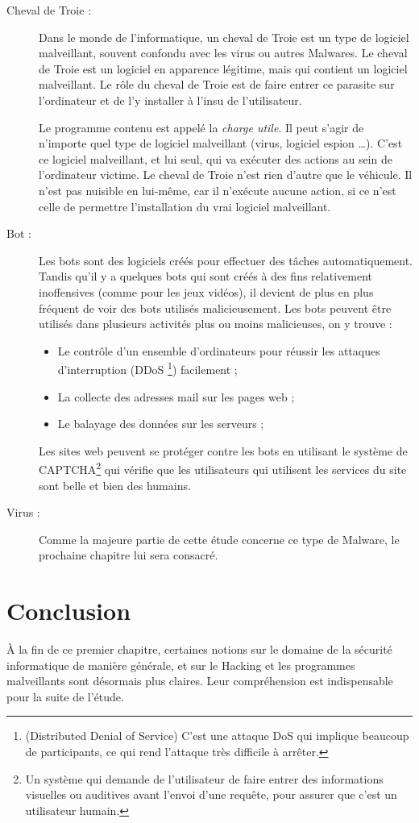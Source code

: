 \begin{description}
        \item[Cheval de Troie :] Dans le monde de l'informatique, un cheval de Troie est un type de logiciel
            malveillant, souvent confondu avec les virus ou autres Malwares. Le cheval de Troie est un logiciel
            en apparence légitime, mais qui contient un logiciel malveillant. Le rôle du cheval de Troie est de faire
            entrer ce parasite sur l'ordinateur et de l'y installer à l'insu de l'utilisateur.

            Le programme contenu est appelé la \emph{charge utile}. Il peut s'agir de n'importe quel type
            de logiciel malveillant (virus, logiciel espion \ldots). C'est ce logiciel malveillant, et lui
            seul, qui va exécuter des actions au sein de l'ordinateur victime. Le cheval de Troie n'est rien
            d'autre que le véhicule. Il n'est pas nuisible en lui-même, car il n'exécute aucune action,
            si ce n'est celle de permettre l'installation du vrai logiciel malveillant. 
            \cite{wikipedia_trojan} %

        \item[Bot :] Les bots sont des logiciels créés pour effectuer des tâches automatiquement. 
            Tandis qu’il y a quelques bots qui sont créés à des fins relativement inoffensives 
            (comme pour les jeux vidéos), il devient de plus en plus fréquent de voir des bots utilisés malicieusement. 
            Les bots peuvent être utilisés dans plusieurs activités plus ou moins malicieuses, on y trouve :
            \begin{itemize}
                \item Le contrôle d'un ensemble d’ordinateurs pour réussir les attaques d’interruption (DDoS
                    \footnote{(Distributed Denial of Service) C'est une attaque DoS qui implique beaucoup de
                    participants, ce qui rend l'attaque très difficile à arrêter.}) facilement ;
                \item La collecte des adresses mail sur les pages web ;
                \item Le balayage des données sur les serveurs ;
            \end{itemize}
            Les sites web peuvent se protéger contre les bots en utilisant le système de 
            CAPTCHA\footnote{Un système qui demande de l'utilisateur de faire entrer des informations visuelles ou
            auditives avant l'envoi d'une requête, pour assurer que c'est un utilisateur humain.} qui vérifie que 
            les utilisateurs qui utilisent les services du site sont belle et bien des humains. 
            \cite{malware_types} %

            \item[Virus :] Comme la majeure partie de cette étude concerne ce type de Malware, 
            le prochaine chapitre lui sera consacré.
    \end{description}

\section{Conclusion}
À la fin de ce premier chapitre, certaines notions sur le domaine de la sécurité informatique de manière générale, et sur le Hacking et les programmes malveillants sont désormais plus claires. 
Leur compréhension est indispensable pour la suite de l'étude. %
